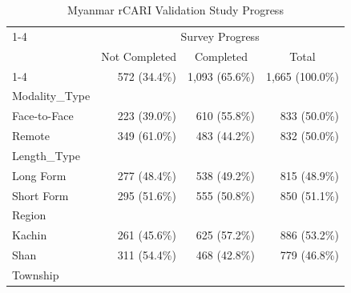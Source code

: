 \documentclass{article}
\begin{document}
\begin{table}[!h]
\caption{Myanmar rCARI Validation Study Progress}
\centering
\begin{tabular}{llll}
\cline{1-4}
\multicolumn{1}{r}{} &
  \multicolumn{3}{c}{Survey Progress} \\
\multicolumn{1}{r}{} &
  \multicolumn{1}{c}{Not Completed} &
  \multicolumn{1}{c}{Completed} &
  \multicolumn{1}{c}{Total} \\
\cline{1-4}
\multicolumn{1}{l}{N} &
  \multicolumn{1}{r}{572 (34.4\%)} &
  \multicolumn{1}{r}{1,093 (65.6\%)} &
  \multicolumn{1}{r}{1,665 (100.0\%)} \\
\multicolumn{1}{l}{Modality\_Type} &
  \multicolumn{1}{r}{} &
  \multicolumn{1}{r}{} &
  \multicolumn{1}{r}{} \\
\multicolumn{1}{l}{\hspace{1em}Face-to-Face} &
  \multicolumn{1}{r}{223 (39.0\%)} &
  \multicolumn{1}{r}{610 (55.8\%)} &
  \multicolumn{1}{r}{833 (50.0\%)} \\
\multicolumn{1}{l}{\hspace{1em}Remote} &
  \multicolumn{1}{r}{349 (61.0\%)} &
  \multicolumn{1}{r}{483 (44.2\%)} &
  \multicolumn{1}{r}{832 (50.0\%)} \\
\multicolumn{1}{l}{Length\_Type} &
  \multicolumn{1}{r}{} &
  \multicolumn{1}{r}{} &
  \multicolumn{1}{r}{} \\
\multicolumn{1}{l}{\hspace{1em}Long Form} &
  \multicolumn{1}{r}{277 (48.4\%)} &
  \multicolumn{1}{r}{538 (49.2\%)} &
  \multicolumn{1}{r}{815 (48.9\%)} \\
\multicolumn{1}{l}{\hspace{1em}Short Form} &
  \multicolumn{1}{r}{295 (51.6\%)} &
  \multicolumn{1}{r}{555 (50.8\%)} &
  \multicolumn{1}{r}{850 (51.1\%)} \\
\multicolumn{1}{l}{Region} &
  \multicolumn{1}{r}{} &
  \multicolumn{1}{r}{} &
  \multicolumn{1}{r}{} \\
\multicolumn{1}{l}{\hspace{1em}Kachin} &
  \multicolumn{1}{r}{261 (45.6\%)} &
  \multicolumn{1}{r}{625 (57.2\%)} &
  \multicolumn{1}{r}{886 (53.2\%)} \\
\multicolumn{1}{l}{\hspace{1em}Shan} &
  \multicolumn{1}{r}{311 (54.4\%)} &
  \multicolumn{1}{r}{468 (42.8\%)} &
  \multicolumn{1}{r}{779 (46.8\%)} \\
\multicolumn{1}{l}{Township} &
  \multicolumn{1}{r}{} &
  \multicolumn{1}{r}{} &
  \multicolumn{1}{r}{} \\

\end{tabular}
\end{table}
\end{document}
